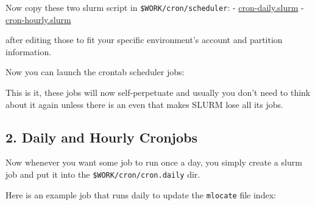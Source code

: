 \documentclass[
]{report}
\newenvironment{Shaded}{\begin{snugshade}}{\end{snugshade}}
\newcommand{\AttributeTok}[1]{\textcolor[rgb]{0.40,0.45,0.13}{#1}}
\newcommand{\BuiltInTok}[1]{\textcolor[rgb]{0.00,0.23,0.31}{#1}}
\newcommand{\CommentTok}[1]{\textcolor[rgb]{0.37,0.37,0.37}{#1}}
\newcommand{\ExtensionTok}[1]{\textcolor[rgb]{0.00,0.23,0.31}{#1}}
\newcommand{\FunctionTok}[1]{\textcolor[rgb]{0.28,0.35,0.67}{#1}}
\newcommand{\NormalTok}[1]{\textcolor[rgb]{0.00,0.23,0.31}{#1}}
\newcommand{\StringTok}[1]{\textcolor[rgb]{0.13,0.47,0.30}{#1}}
\newcommand{\VariableTok}[1]{\textcolor[rgb]{0.07,0.07,0.07}{#1}}
\begin{document}
Now copy these two slurm script in \texttt{\$WORK/cron/scheduler}: -
\url{cron-daily.slurm} - \url{cron-hourly.slurm}

after editing those to fit your specific environment's account and
partition information.

Now you can launch the crontab scheduler jobs:

\begin{Shaded}
\end{Shaded}

This is it, these jobs will now self-perpetuate and usually you don't
need to think about it again unless there is an even that makes SLURM
lose all its jobs.

\subsection{2. Daily and Hourly
Cronjobs}\label{daily-and-hourly-cronjobs}

Now whenever you want some job to run once a day, you simply create a
slurm job and put it into the \texttt{\$WORK/cron/cron.daily} dir.

Here is an example job that runs daily to update the \texttt{mlocate}
file index:

\begin{Shaded}
\end{Shaded}
\end{document}
